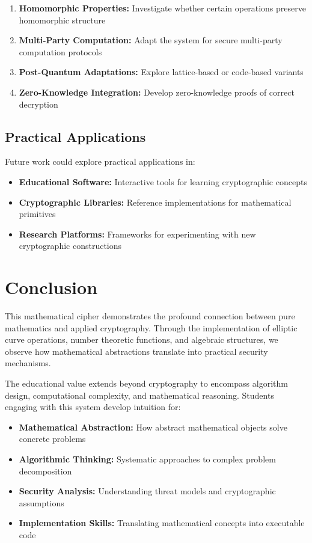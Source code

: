 \documentclass[12pt,a4paper]{article}
\begin{document}
\begin{enumerate}
    \item \textbf{Homomorphic Properties:} Investigate whether certain operations preserve homomorphic structure
    \item \textbf{Multi-Party Computation:} Adapt the system for secure multi-party computation protocols
    \item \textbf{Post-Quantum Adaptations:} Explore lattice-based or code-based variants
    \item \textbf{Zero-Knowledge Integration:} Develop zero-knowledge proofs of correct decryption
\end{enumerate}

\subsection{Practical Applications}

Future work could explore practical applications in:

\begin{itemize}
    \item \textbf{Educational Software:} Interactive tools for learning cryptographic concepts
    \item \textbf{Cryptographic Libraries:} Reference implementations for mathematical primitives
    \item \textbf{Research Platforms:} Frameworks for experimenting with new cryptographic constructions
\end{itemize}

\section{Conclusion}

This mathematical cipher demonstrates the profound connection between pure mathematics and applied cryptography. Through the implementation of elliptic curve operations, number theoretic functions, and algebraic structures, we observe how mathematical abstractions translate into practical security mechanisms.

The educational value extends beyond cryptography to encompass algorithm design, computational complexity, and mathematical reasoning. Students engaging with this system develop intuition for:

\begin{itemize}
    \item \textbf{Mathematical Abstraction:} How abstract mathematical objects solve concrete problems
    \item \textbf{Algorithmic Thinking:} Systematic approaches to complex problem decomposition
    \item \textbf{Security Analysis:} Understanding threat models and cryptographic assumptions
    \item \textbf{Implementation Skills:} Translating mathematical concepts into executable code
\end{itemize}
\end{document}
